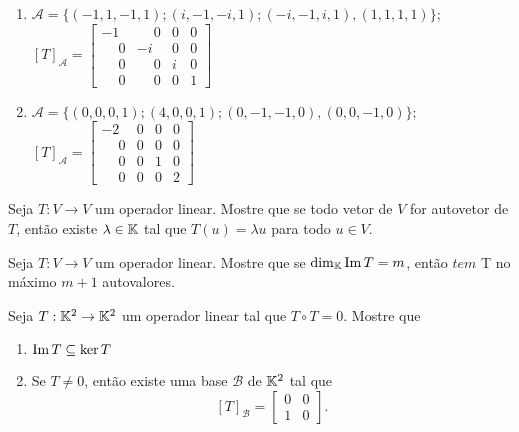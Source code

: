 \documentclass[12pt]{exam}
\begin{document}
\begin{exercicio}
\begin{solucao}
\begin{enumerate}[label=({\alph*})]
          \item $\mathcal{A} = \{(-1,1,-1,1); (i,-1,-i,1); (-i,-1,i,1), (1,1,1,1)\}$; $[T]_\mathcal{A} = \begin{bmatrix} -1 & \phantom{-}0 & 0 & 0\\ \phantom{-} 0 & -i & 0 & 0\\ \phantom{-} 0 & \phantom{-}0 & i & 0\\ \phantom{-}0 & \phantom{-}0 & 0 & 1\end{bmatrix}$
          \item $\mathcal{A} = \{(0,0,0,1); (4,0,0,1); (0,-1,-1,0), (0,0,-1,0)\}$; $[T]_\mathcal{A} = \begin{bmatrix} -2 & 0 & 0 & 0\\ \phantom{-} 0 & 0 & 0 & 0\\ \phantom{-} 0 & 0 & 1 & 0\\ \phantom{-}0 & 0 & 0 & 2\end{bmatrix}$
        \end{enumerate}
  \end{solucao}
\end{exercicio}

\begin{exercicio}
  Seja $T : V \to V$ um operador linear. Mostre que se todo vetor de $V$ for autovetor de $T$, ent\~ao existe $\lambda \in \mathbb{K}$ tal que $T(u) = \lambda u$ para todo $u \in V$.
\end{exercicio}

\begin{exercicio}
  Seja $T : V \to V$ um operador linear. Mostre que se $\dim_{\mathbb{K}}{\rm Im\,} T = m$, ent\~ao $tem$ T no m\'aximo $m + 1$ autovalores.
\end{exercicio}

\begin{exercicio}
  Seja $T : \mathbb{K}^2 \to \mathbb{K}^2$ um operador linear tal que $T \circ T = 0$. Mostre que
  \begin{enumerate}[label=({\alph*})]
    \item ${\rm Im\,} T \subseteq \ker T$
    \item Se $T \ne 0$, ent\~ao existe uma base $\mathcal{B}$ de $\mathbb{K}^2$ tal que
    \[
      [T]_\mathcal{B} = \begin{bmatrix} 0 & 0\\ 1 & 0\end{bmatrix}.
    \]
  \end{enumerate}
\end{exercicio}
\end{document}
